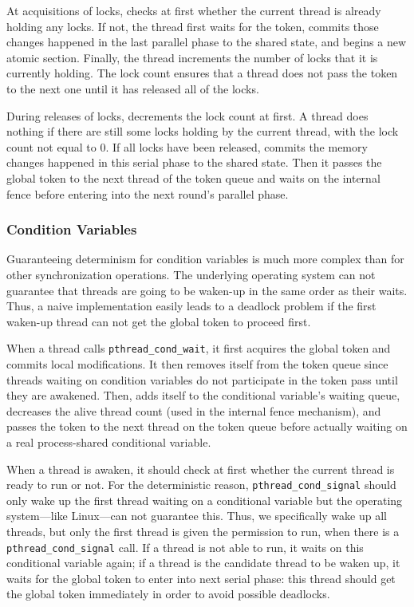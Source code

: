At acquisitions of locks, \dthreads{} checks at first whether the current thread is already holding any locks. If not, the thread first waits for the token, commits those changes happened in the last parallel phase to the shared state, and begins a new atomic section. Finally, the thread increments the number of locks that it is currently holding. The lock count ensures that a thread does not pass the token to the next one until it has released all of the locks.

During releases of locks, \dthreads{} decrements the lock count at first. A thread does nothing if there are still some locks holding by the current thread, with the lock count not equal to 0. If all locks have been released, \dthreads{} commits the memory changes happened in this serial phase to the shared state. Then it passes the global token to the next thread of the token queue and waits on the internal fence before entering into the next round's parallel phase.

\subsubsection{Condition Variables}
\label{sec:condwait}

Guaranteeing determinism for condition variables is much more complex than for other synchronization operations. The underlying operating system can not guarantee that threads are going to be waken-up in the same order as their waits. Thus, a naive implementation easily leads to a deadlock problem if the first waken-up thread can not get the global token to proceed first.

When a thread calls \texttt{pthread\_cond\_wait}, it first acquires the global token and commits local modifications. It then removes itself from the token queue since threads waiting on condition variables do not participate in the token pass until they are awakened. Then, \dthreads{} adds itself to the conditional variable's waiting queue, decreases the alive thread count (used in the internal fence mechanism), and passes the token to the next thread on the token queue before actually waiting on a real process-shared conditional variable. 

When a thread is awaken, it should check at first whether the current thread is ready to run or not. For the deterministic reason, \texttt{pthread\_cond\_signal} should only wake up the first thread waiting on a conditional variable but the operating system---like Linux---can not guarantee this. Thus, we specifically wake up all threads, but only the first thread is given the permission to run, when there is a \texttt{pthread\_cond\_signal} call. If a thread is not able to run, it waits on this conditional variable again; if a thread is the candidate thread to be waken up, it waits for the global token to enter into next serial phase: this thread should get the global token immediately in order to avoid possible deadlocks. 

